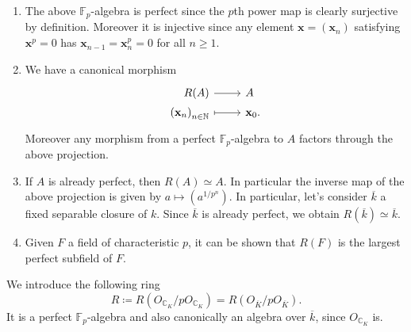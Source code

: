 \begin{rem}[]\leavevmode\vspace{-.2\baselineskip}
\begin{enumerate}
\item The above $\mathbb{F}_p$-algebra is perfect
	since the $p$th power map is clearly surjective by definition.
	Moreover it is injective since any element $\mathbf{x} = \left( \mathbf{x}_n \right)$
	satisfying $\mathbf{x}^p = 0$ has
	$\mathbf{x}_{n-1} = \mathbf{x}_n^p = 0$ for all $n \geq 1$.

\item We have a canonical morphism
	\begin{equation*}
	\begin{tikzcd}[row sep = 0ex
		,/tikz/column 1/.append style={anchor=base east}
		,/tikz/column 2/.append style={anchor=base west}]
		R(A) \arrow[r, "", rightarrow] &
		A \\
		\left( \mathbf{x}_n \right)_{n \in \mathbb{N}} \arrow[r, "", mapsto] & 
		\mathbf{x}_0
	.\end{tikzcd}
	\end{equation*} 
	Moreover any morphism from a perfect $\mathbb{F}_p$-algebra
	to $A$ factors through the above projection.

\item If $A$ is already perfect, then $R(A) \simeq A$.
	In particular the inverse map of the above projection is given by
	$a \mapsto \left( a^{1/p^n} \right)$.
	In particular, let's consider $\overline{k}$ a fixed separable closure of $k$.
	Since $\overline{k}$ is already perfect, we obtain $R(\overline{k}) \simeq \overline{k}$.

\item Given $F$ a field of characteristic $p$, it can be shown that 
	$R(F)$ is the largest perfect subfield of $F$.
\end{enumerate}
\end{rem}


\begin{ntt}[]
	We introduce the following ring
	\begin{equation*}
		R \coloneqq R(O_{\mathbb{C}_K}/pO_{\mathbb{C}_K}) =
		R(O_{\overline{K}}/pO_{\overline{K}})
	.\end{equation*}
	It is a perfect $\mathbb{F}_p$-algebra and also canonically an
	algebra over $\overline{k}$, since $O_{\mathbb{C}_K}$ is.
\end{ntt}


